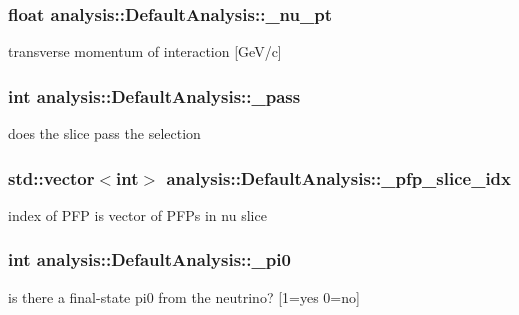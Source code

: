 \subsubsection[{\texorpdfstring{\+\_\+nu\+\_\+pt}{_nu_pt}}]{\setlength{\rightskip}{0pt plus 5cm}float analysis\+::\+Default\+Analysis\+::\+\_\+nu\+\_\+pt\hspace{0.3cm}{\ttfamily [private]}}\hypertarget{classanalysis_1_1DefaultAnalysis_a901956985dfd610c781bedf7bfc9754a}{}\label{classanalysis_1_1DefaultAnalysis_a901956985dfd610c781bedf7bfc9754a}
transverse momentum of interaction \mbox{[}Ge\+V/c\mbox{]} 
\subsubsection[{\texorpdfstring{\+\_\+pass}{_pass}}]{\setlength{\rightskip}{0pt plus 5cm}int analysis\+::\+Default\+Analysis\+::\+\_\+pass\hspace{0.3cm}{\ttfamily [private]}}\hypertarget{classanalysis_1_1DefaultAnalysis_a8d58d05d4b0750a67babff41beece3ac}{}\label{classanalysis_1_1DefaultAnalysis_a8d58d05d4b0750a67babff41beece3ac}
does the slice pass the selection 
\subsubsection[{\texorpdfstring{\+\_\+pfp\+\_\+slice\+\_\+idx}{_pfp_slice_idx}}]{\setlength{\rightskip}{0pt plus 5cm}std\+::vector$<$int$>$ analysis\+::\+Default\+Analysis\+::\+\_\+pfp\+\_\+slice\+\_\+idx\hspace{0.3cm}{\ttfamily [private]}}\hypertarget{classanalysis_1_1DefaultAnalysis_acbf0c279993cbefca72f38bc5e9f6627}{}\label{classanalysis_1_1DefaultAnalysis_acbf0c279993cbefca72f38bc5e9f6627}
index of P\+FP is vector of P\+F\+Ps in nu slice 
\subsubsection[{\texorpdfstring{\+\_\+pi0}{_pi0}}]{\setlength{\rightskip}{0pt plus 5cm}int analysis\+::\+Default\+Analysis\+::\+\_\+pi0\hspace{0.3cm}{\ttfamily [private]}}\hypertarget{classanalysis_1_1DefaultAnalysis_a2a00585c8fd4fcc84f42d50f271ff78a}{}\label{classanalysis_1_1DefaultAnalysis_a2a00585c8fd4fcc84f42d50f271ff78a}
is there a final-\/state pi0 from the neutrino? \mbox{[}1=yes 0=no\mbox{]} 
